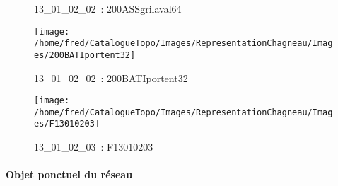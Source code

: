 \documentclass[12pt,titlepage,oneside]{book}
\begin{document}
\begin{figure}[h!]
\begin{minipage}[t]{3cm}
\begin{center}
      \caption[~13\_01\_02\_02]{\small{13\_01\_02\_02~:} \tiny{200ASSgrilaval64}}\label{200ASSgrilaval64}
    \end{center}
  \end{minipage}
  \begin{minipage}[t]{3cm}
    \begin{center}
      \texttt{[image: /home/fred/CatalogueTopo/Images/RepresentationChagneau/Images/200BATIportent32]}
      \caption[~13\_01\_02\_02]{\small{13\_01\_02\_02~:} \tiny{200BATIportent32}}\label{200BATIportent32}
    \end{center}
  \end{minipage}
  \begin{minipage}[t]{3cm}
    \begin{center}
      \texttt{[image: /home/fred/CatalogueTopo/Images/RepresentationChagneau/Images/F13010203]}
      \caption[~13\_01\_02\_03]{\small{13\_01\_02\_03~:} \tiny{F13010203}}\label{F13010203}
    \end{center}
  \end{minipage}
\end{figure}


\paragraph{Objet ponctuel du réseau}
\noindent
\vspace{\baselineskip}
\end{document}
